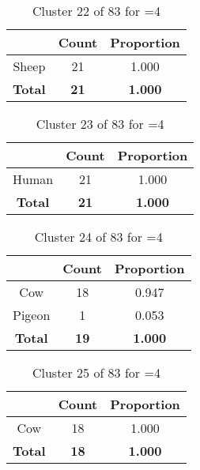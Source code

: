 \begin{table}[ht!]
\centering
\begin{tabular}{|c|c|c|}
\hline
\bf \Spec{} &\bf Count &\bf Proportion\\ \hline \hline
Sheep & 21 & 1.000\\ \hline
\hline
\bf Total & \bf 21 & \bf 1.000\\ \hline
\end{tabular}
\label{tab:cluster:22:4}
\caption{Cluster 22 of 83 for \minneigh{}=4}
\end{table}

\begin{table}[ht!]
\centering
\begin{tabular}{|c|c|c|}
\hline
\bf \Spec{} &\bf Count &\bf Proportion\\ \hline \hline
Human & 21 & 1.000\\ \hline
\hline
\bf Total & \bf 21 & \bf 1.000\\ \hline
\end{tabular}
\label{tab:cluster:23:4}
\caption{Cluster 23 of 83 for \minneigh{}=4}
\end{table}

\begin{table}[ht!]
\centering
\begin{tabular}{|c|c|c|}
\hline
\bf \Spec{} &\bf Count &\bf Proportion\\ \hline \hline
Cow & 18 & 0.947\\ \hline
Pigeon & 1 & 0.053\\ \hline
\hline
\bf Total & \bf 19 & \bf 1.000\\ \hline
\end{tabular}
\label{tab:cluster:24:4}
\caption{Cluster 24 of 83 for \minneigh{}=4}
\end{table}

\begin{table}[ht!]
\centering
\begin{tabular}{|c|c|c|}
\hline
\bf \Spec{} &\bf Count &\bf Proportion\\ \hline \hline
Cow & 18 & 1.000\\ \hline
\hline
\bf Total & \bf 18 & \bf 1.000\\ \hline
\end{tabular}
\label{tab:cluster:25:4}
\caption{Cluster 25 of 83 for \minneigh{}=4}
\end{table}

